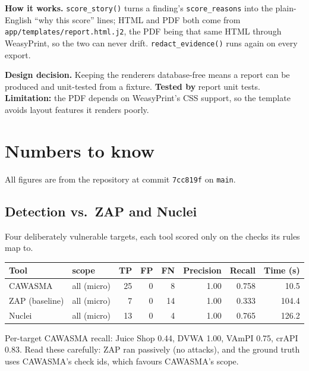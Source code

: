 \textbf{How it works.} \texttt{score\_story()} turns a finding's
\texttt{score\_reasons} into the plain-English ``why this score'' lines; HTML and
PDF both come from \texttt{app/templates/report.html.j2}, the PDF being that same
HTML through WeasyPrint, so the two can never drift. \texttt{redact\_evidence()}
runs again on every export.

\textbf{Design decision.} Keeping the renderers database-free means a report can
be produced and unit-tested from a fixture. \textbf{Tested by} report unit tests.
\textbf{Limitation:} the PDF depends on WeasyPrint's CSS support, so the template
avoids layout features it renders poorly.

\section{Numbers to know}
All figures are from the repository at commit \texttt{7cc819f} on \texttt{main}.

\subsection{Detection vs.\ ZAP and Nuclei}
Four deliberately vulnerable targets, each tool scored only on the checks its
rules map to.
\begin{center}\small
\begin{tabular}{@{}llrrrrrr@{}}
\toprule
Tool & scope & TP & FP & FN & Precision & Recall & Time (s)\\
\midrule
CAWASMA & all (micro) & 25 & 0 & 8 & 1.00 & 0.758 & 10.5\\
ZAP (baseline) & all (micro) & 7 & 0 & 14 & 1.00 & 0.333 & 104.4\\
Nuclei & all (micro) & 13 & 0 & 4 & 1.00 & 0.765 & 126.2\\
\bottomrule
\end{tabular}
\end{center}
Per-target CAWASMA recall: Juice Shop 0.44, DVWA 1.00, VAmPI 0.75, crAPI 0.83.
Read these carefully: ZAP ran passively (no attacks), and the ground truth uses
CAWASMA's check ids, which favours CAWASMA's scope.

